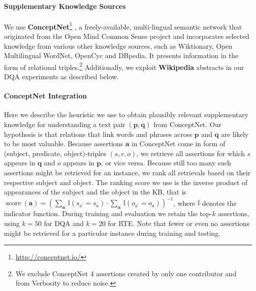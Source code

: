 \documentclass[11pt,a4paper]{article}
\begin{document}
\paragraph{Supplementary Knowledge Sources} We use \textbf{ConceptNet}\footnote{\url{http://conceptnet.io/}} \citep{Speer2012}, a freely-available, multi-lingual semantic network that originated from the Open Mind Common Sense project and incorporates selected knowledge from various other knowledge sources, such as Wiktionary, Open Multilingual WordNet, OpenCyc and DBpedia. It presents information in the form of relational triples.\footnote{We exclude ConceptNet 4 assertions created by only one contributor and from Verbosity to reduce noise.} Additionally, we exploit \textbf{Wikipedia} abstracts in our DQA experiments as described below.

\paragraph{ConceptNet Integration}
Here we describe the heuristic we use to obtain plausibly relevant supplementary knowledge for understanding a text pair $(\boldsymbol{p},\boldsymbol{q})$ from ConceptNet. Our hypothesis is that relations that link words and phrases across $\boldsymbol{p}$ and $\boldsymbol{q}$ are likely to be most valuable. Because assertions $\boldsymbol{a}$ in ConceptNet come in form of (subject, predicate, object)-triples $(s,r,o)$, we retrieve all assertions for which $s$ appears in $\boldsymbol{q}$ and $o$ appears in $\boldsymbol{p}$, or vice versa. Because still too many such assertions might be retrieved for an instance, we rank all retrievals based on their respective subject and object. The ranking score we use is the inverse product of appearances of the subject and the object in the KB, that is $\operatorname{score}(\boldsymbol{a}) = \left( \sum_{\boldsymbol{a}^\prime} \mathbb{I}(s_{a^\prime} = s_a) \cdot \sum_{\boldsymbol{a}^\prime} \mathbb{I}(o_{a^\prime} = o_a) \right)^{-1}$, where $\mathbb{I}$ denotes the indicator function.
During training and evaluation we retain the top-$k$ assertions, using $k=50$ for DQA and $k=20$ for RTE. Note that fewer or even no assertions might be retrieved for a particular instance during training and testing.
\end{document}
